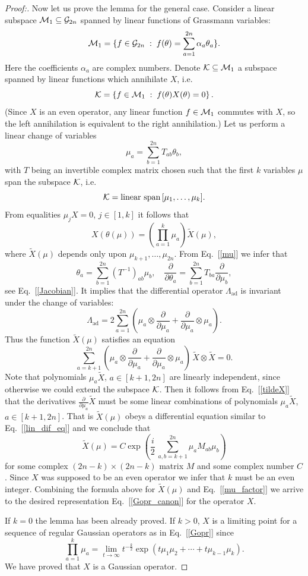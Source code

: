 \documentclass[twocolumn,showpacs,preprintnumbers,superscriptaddress]{revtex4}
\newcommand{\calM}{{\cal M }}
\newcommand{\calK}{{\cal K }}
\newcommand{\Gr}{{\cal G}}
\newcommand{\drv}[1]{\frac{\partial}{\partial{#1}}}
\newcommand{\ad}{{\mathrm{ad}}}
\newcommand{\be}{\begin{equation}}
\newcommand{\ee}{\end{equation}}
\begin{document}
\begin{proof}[Proof:]
Now let us prove the lemma for the general case.
Consider a linear subspace $\calM_1\subseteq \Gr_{2n}$ spanned by
linear functions of Grassmann variables:
\[
\calM_1=\{f\in \Gr_{2n}\; : \;
f(\theta) = \sum_{a=1}^{2n} \alpha_a \theta_a\}.
\]
Here the coefficients $\alpha_a$ are complex numbers.
Denote $\calK\subseteq \calM_1$ a subspace spanned by linear functions
which annihilate $X$, i.e.
\[
\calK=\left\{ f\in \calM_1 \; : \; f(\theta)X(\theta)=0\right\}.
\]
(Since $X$ is an even operator, any linear function $f\in \calM_1$ commutes with $X$,
so the left annihilation is equivalent to the right annihilation.)
Let us perform a linear change of variables 
\be\label{mu}
\mu_a=\sum_{b=1}^{2n} T_{ab} \theta_b, 
\ee
with $T$ being an invertible complex matrix chosen
such  that the first $k$ variables $\mu$ span the subspace $\calK$, i.e.
\[
\calK=\mbox{linear span}\, [ \mu_1,\ldots,\mu_k].
\]
From equalities $\mu_j X=0$, $j\in [1,k]$ it follows that 
\be\label{mu_factor}
X(\theta(\mu))=\left(\prod_{a=1}^k \mu_a \right) \tilde{X}(\mu),
\ee
where $\tilde{X}(\mu)$ depends only upon $\mu_{k+1},\ldots,\mu_{2n}$.
From Eq.~[\ref{mu}] we infer that
\[
\theta_a = \sum_{b=1}^{2n} (T^{-1})_{ab} \mu_b, \quad
\drv{\theta_a} = \sum_{b=1}^{2n} T_{ba} \drv{\mu_b},
\]
see Eq.~[\ref{Jacobian}].
It implies that the differential operator $\Lambda_{\ad}$ is invariant under
the change of variables:
\[
\Lambda_{\ad}=2\sum_{a=1}^{2n} 
\left( \mu_a \otimes \drv{\mu_a} + \drv{\mu_a}\otimes \mu_a 
\right).
\]
Thus the function $\tilde{X}(\mu)$ satisfies an equation
\be\label{tildeX}
 \sum_{a=k+1}^{2n}
\left( 
\mu_a\otimes \drv{\mu_a} + \drv{\mu_a}\otimes \mu_a
\right)\, \tilde{X}\otimes \tilde{X}=0.
\ee
Note that polynomials $\mu_{a}\tilde{X}$, $a\in[k+1,2n]$ are
linearly independent, since otherwise we could extend the subspace $\calK$.
Then it follows from Eq.~[\ref{tildeX}] that the derivatives 
$\drv{\mu_a} \tilde{X}$ must be some linear combinations of 
polynomials $\mu_a \tilde{X}$, $a\in [k+1,2n]$. 
That is $\tilde{X}(\mu)$ obeys a differential equation similar to Eq.~[\ref{lin_dif_eq}]
and we conclude that
\[
\tilde{X}(\mu) = C \exp{\left( \frac{i}2 \,
\sum_{a,b=k+1}^{2n} \mu_a M_{ab} \mu_b 
\right)}
\]
for some complex $(2n-k)\times (2n-k)$ matrix $M$ and some complex number $C$.
Since $X$ was supposed to be an even operator we infer that $k$ must be an 
even integer. Combining the formula above for $\tilde{X}(\mu)$ and Eq.~[\ref{mu_factor}]
we arrive to the desired representation Eq.~[\ref{Gopr_canon}]
for the operator $X$.

If $k=0$ the lemma has been already proved. If $k>0$, $X$ is a limiting point
for a sequence of regular Gaussian operators
as in Eq.~[\ref{Gopr}] since
\[
\prod_{a=1}^k \mu_a =\lim_{t\to \infty} t^{-\frac{k}2} \exp{\left( t\mu_1\mu_2 +
\cdots + t\mu_{k-1}\mu_k \right)}.
\]
We have proved that $X$ is a Gaussian operator.
\end{proof}
\end{document}
